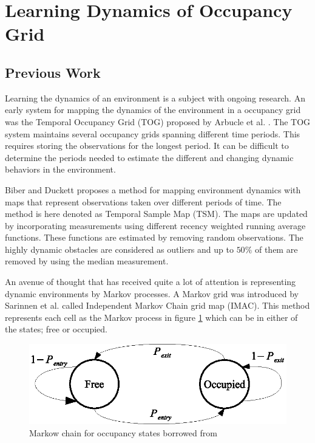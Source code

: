 \section{Learning Dynamics of Occupancy Grid}
\label{sec:learning_dynamics_of_env}

\subsection{Previous Work}
Learning the dynamics of an environment is a subject with ongoing research.
An early system for mapping the dynamics of the environment in a occupancy grid was the Temporal Occupancy Grid (TOG) proposed by Arbucle et al. \cite{Arbuckle2002}. The TOG system maintains several occupancy grids spanning different time periods. This requires storing the observations for the longest period. It can be difficult to determine the periods needed to estimate the different and changing dynamic behaviors in the environment.

Biber and Duckett \cite{Biber2005} proposes a method for mapping environment dynamics with maps that represent observations taken over different periods of time. The method is here denoted as Temporal Sample Map (TSM). The maps are updated by incorporating measurements using different recency weighted running average functions. These functions are estimated by removing random observations. The highly dynamic obstacles are considered as outliers and up to $50\%$ of them are removed by using the median measurement.

An avenue of thought that has received quite a lot of attention is  representing dynamic environments by Markov processes.  
A Markov grid was introduced by Sarinnen et al. \cite{Saarinen2012} called Independent Markov Chain grid map (IMAC). This method represents each cell as the Markov process in figure \ref{fig:markow_occupancy_model} which can be in either of the states; free or occupied. 

\begin{figure}[tbph]
	\centering
	\includegraphics[width=0.7\linewidth]{chapters/mapping_of_dynamic_areas/figures/markow_occupancy_model}
	\caption{Markow chain for occupancy states borrowed from \cite{Saarinen2012}}
	\label{fig:markow_occupancy_model}
\end{figure}

